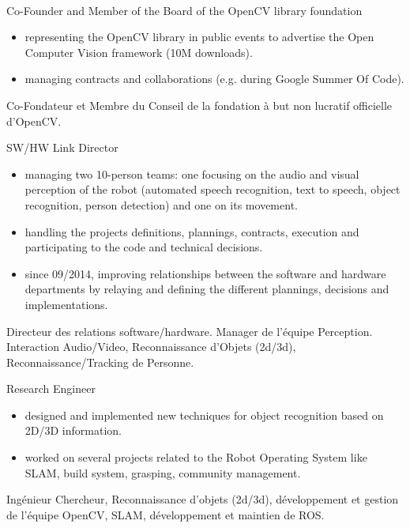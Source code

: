 \documentclass{article}
\begin{document}
\begin{llist}
\\
{
Co-Founder and Member of the Board of the OpenCV library foundation
\vspace{-0.33cm}
\begin{itemize}
 \item representing the OpenCV library in public events to advertise the Open Computer Vision framework (10M downloads).
 \item managing contracts and collaborations (e.g. during Google Summer Of Code).
\end{itemize}
}
{
Co-Fondateur et Membre du Conseil de la fondation \`{a} but non lucratif officielle d'OpenCV.
}

{
SW/HW Link Director
\vspace{-0.33cm}
\begin{itemize}
 \item managing two 10-person teams: one focusing on the audio and visual perception of the robot (automated speech 
recognition, text to speech, object recognition, person detection) and one on its movement.
 \item handling the projects definitions, plannings, contracts, execution and participating to the code and technical 
decisions.
 \item since 09/2014, improving relationships between the software and hardware departments by relaying and defining 
the different plannings, decisions and implementations.
\end{itemize}
}
{
Directeur des relations software/hardware.
Manager de l'\'{e}quipe Perception. Interaction Audio/Video, Reconnaissance d'Objets (2d/3d), Reconnaissance/Tracking 
de 
Personne.
}

{
Research Engineer
\vspace{-0.33cm}
\begin{itemize}
 \item designed and implemented new techniques for object recognition based on 2D/3D information.
 \item worked on several projects related to the Robot Operating System like SLAM, build system, grasping, community 
management.
\end{itemize}
}
{
Ing\'{e}nieur Chercheur, Reconnaissance d'objets (2d/3d), d\'{e}veloppement et gestion de l'\'{e}quipe 
OpenCV, SLAM, d\'{e}veloppement et maintien de ROS.
}


\end{llist}
\end{document}
